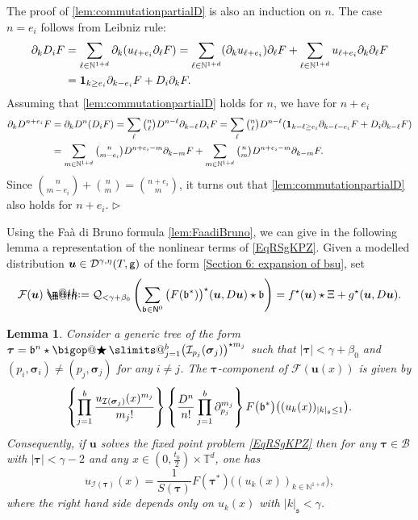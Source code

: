 \documentclass[10pt, reqno]{amsart}
\makeatletter
\numberwithin{subsection}{section}
\numberwithin{subsubsection}{subsection}
\numberwithin{equation}{section} %
\newenvironment{Dem}[1][\unskip]{%
    \begin{list}{\hspace{1.15cm}{\sf \textbf{{\small Proof #1 --}}}}{%
        \setlength{\topsep}{0pt}%
        \setlength{\leftmargin}{0pt}%
        \setlength{\rightmargin}{0pt}%
        \setlength{\listparindent}{0pt}%
        \setlength{\itemindent}{0pt}%
        \setlength{\parsep}{0pt}%
        \addtolength{\leftmargin}{0pt}%
        \addtolength{\rightmargin}{0pt}%
    } \item }{\hfill $\rhd$\end{list}\smallskip}
\theoremstyle{mystyle}
\newtheorem{lem}[thm]{\hspace{-0.14cm}  {Lemma} }%
\theoremstyle{mystyle2}
\theoremstyle{mystyle3}
\DeclareRobustCommand\bigop[1]{%
  \mathop{\vphantom{\sum}\mathpalette\bigop@{#1}}\slimits@
}
\newcommand{\bigop@}[2]{%
  \vcenter{%
    \sbox\z@{$#1\sum$}%
    \hbox{\resizebox{\ifx#1\displaystyle.9\fi\dimexpr\ht\z@+\dp\z@}{!}{$\m@th#2$}}%
  }%
}
\newcommand{\Bigstar}{\DOTSB\bigop{\bigstar}}
\newcommand{\mcF}{\boldsymbol{p}}
\newcommand{\bsu}{\boldsymbol{u}}
\newcommand{\bstau}{\boldsymbol{\tau}}
\newcommand{\bssigma}{\boldsymbol{\sigma}}
\newcommand{\mfs}{\mathfrak{s}}
\newcommand\bbN{\mathbb{N}}
\newcommand{\bbT}{\mathbb{T}}
\newcommand{\mcB}{\mathcal{B}}
\newcommand{\mcD}{\mathcal{D}}
\renewcommand{\mcF}{\mathcal{F}}
\newcommand{\mcI}{\mathcal{I}}
\newcommand*{\defeq}{\mathrel{\rlap{%
                     \raisebox{0.3ex}{$\m@th\cdot$}}%
                     \raisebox{-0.3ex}{$\m@th\cdot$}}%
                     =}
\makeatother
\begin{document}
\begin{Dem}
The proof of \eqref{lem:commutationpartialD} is also an induction on $n$. The case $n=e_i$ follows from Leibniz rule:
\begin{align*}
\partial_kD_iF&=\sum_{\ell\in\bbN^{1+d}}\partial_k(u_{\ell+e_i}\partial_\ell F)
=\sum_{\ell\in\bbN^{1+d}}(\partial_ku_{\ell+e_i})\partial_\ell F+\sum_{\ell\in\bbN^{1+d}}u_{\ell+e_i}\partial_k\partial_\ell F\\
&={\bf1}_{k\ge e_i}\partial_{k-e_i}F+D_i\partial_kF.
\end{align*}
Assuming that \eqref{lem:commutationpartialD} holds for $n$, we have for $n+e_i$
\begin{align*}
\partial_kD^{n+e_i}F&=\partial_kD^n(D_iF)=\sum_{\ell}{\textstyle\binom{n}{\ell}}D^{n-\ell}\partial_{k-\ell}D_iF
=\sum_{\ell}{\textstyle\binom{n}{\ell}}D^{n-\ell}({\bf1}_{k-\ell\ge e_i}\partial_{k-\ell-e_i}F+D_i\partial_{k-\ell}F)
\\
&=\sum_{m\in\bbN^{1+d}}{\textstyle\binom{n}{m-e_i}}D^{n+e_i-m}\partial_{k-m} F+\sum_{m\in\bbN^{1+d}}{\textstyle\binom{n}{m}}D^{n+e_i-m}\partial_{k-m} F.
\end{align*}
Since $\binom{n}{m-e_i}+\binom{n}{m}=\binom{n+e_i}{m}$, it turns out that \eqref{lem:commutationpartialD} also holds for $n+e_i$.
\end{Dem}

\medskip

Using the Fa\`a di Bruno formula \eqref{lem:FaadiBruno}, we can give in the following lemma a representation of the nonlinear terms of \eqref{EqRSgKPZ}.
Given a modelled distribution $\bsu\in\mcD^{\gamma,\eta}(T,\sf g)$ of the form \eqref{Section 6: expansion of bsu}, set
$$
\mcF(\bsu) \defeq  \mathcal{Q}_{<\gamma+\beta_0}\left(\sum_{\frak{b}\in{\sf N}^0} \big(F(\frak{b}^*)\big)^\star(\bsu, D\bsu  )\star\frak{b}\right) = f^\star(\bsu)\star \Xi + g^\star(\bsu, D\bsu  ).
$$

\begin{lem}\label{lem ExpSol bsu}
Consider a generic tree of the form $\bstau = \frak{b}^n\star\Bigstar_{j=1}^b \big(\mcI_{p_j}(\bssigma_j)\big)^{\star m_j}$ such that $|\bstau|<\gamma+\beta_0$ and $(p_i,\bssigma_i)\neq(p_j,\bssigma_j)$ for any $i\neq j$.
The $\bstau$-component of $\mcF(\bsu(x))$ is given by
\begin{equation} \label{EqCoherence*}
\left\{\prod_{j=1}^b \frac{u_{\mcI(\bssigma_j)}(x)^{m_j}}{m_j!}\right\} \left\{\frac{D^n}{n!}\prod_{j=1}^b \partial_{p_j}^{m_j}\right\}F\big(\frak{b}^*\big)\big((u_k(x))_{|k|_\mfs\le1}\big).
\end{equation}
Consequently, if $\bsu$ solves the fixed point problem \eqref{EqRSgKPZ} then
for any $\bstau\in\mcB$ with $|\bstau|<\gamma-2$ and any $x\in(0,\frac{t_0}2)\times\bbT^d$, one has
\begin{equation} \label{EqCoherence}
u_{\mcI(\bstau)}(x)=\frac1{S(\bstau)}F(\bstau^*)\big((u_k(x))_{k\in\bbN^{1+d}}\big),
\end{equation}
where the right hand side depends only on $u_k(x)$ with $|k|_\mfs<\gamma$.
\end{lem}
\end{document}
